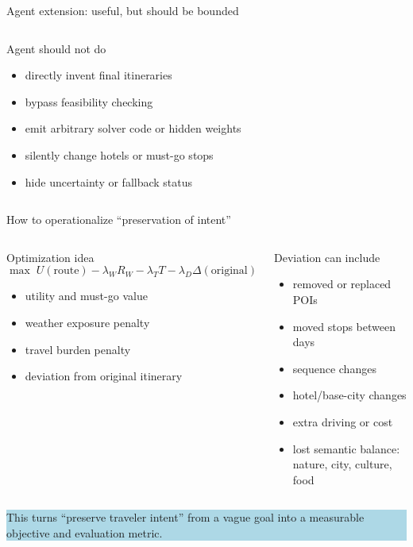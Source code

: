 \documentclass[aspectratio=169,10pt]{beamer}
\begin{document}
\begin{frame}{Agent extension: useful, but should be bounded}
\begin{columns}[T,onlytextwidth]
\begin{block}{Agent should not do}
\begin{itemize}
\item directly invent final itineraries
\item bypass feasibility checking
\item emit arbitrary solver code or hidden weights
\item silently change hotels or must-go stops
\item hide uncertainty or fallback status
\end{itemize}
\end{block}
\end{columns}
\end{frame}

\begin{frame}{How to operationalize ``preservation of intent''}
\begin{columns}[T,onlytextwidth]
\begin{block}{Optimization idea}
\small
\[
\max\; U(\text{route}) - \lambda_W R_W - \lambda_T T - \lambda_D \Delta(\text{original})
\]
\vspace{-0.5em}
\begin{itemize}
  \item utility and must-go value
  \item weather exposure penalty
  \item travel burden penalty
  \item deviation from original itinerary
\end{itemize}
\end{block}

\begin{block}{Deviation can include}
\begin{itemize}
  \item removed or replaced POIs
  \item moved stops between days
  \item sequence changes
  \item hotel/base-city changes
  \item extra driving or cost
  \item lost semantic balance: nature, city, culture, food
\end{itemize}
\end{block}
\end{columns}

\vspace{0.45em}
\centering
\colorbox{LightBlue}{\parbox{0.86\textwidth}{\centering\small This turns ``preserve traveler intent'' from a vague goal into a measurable objective and evaluation metric.}}
\end{frame}
\end{document}

